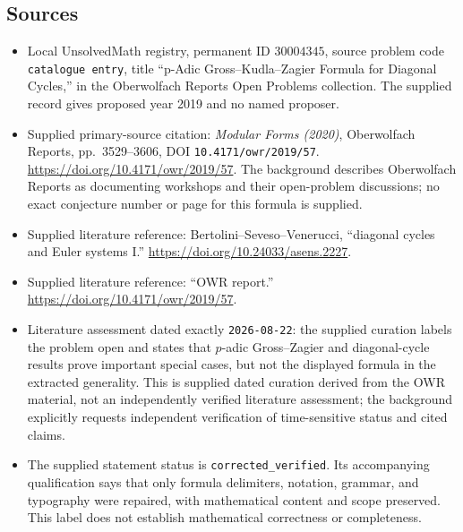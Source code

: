 \documentclass[11pt]{article}
\begin{document}
\subsection{Sources}
\begin{itemize}
\item Local UnsolvedMath registry, permanent ID \(30004345\), source problem code \texttt{catalogue entry}, title ``p-Adic Gross--Kudla--Zagier Formula for Diagonal Cycles,'' in the Oberwolfach Reports Open Problems collection. The supplied record gives proposed year 2019 and no named proposer.
\item Supplied primary-source citation: \emph{Modular Forms (2020)}, Oberwolfach Reports, pp.~3529--3606, DOI \texttt{10.4171/owr/2019/57}. \url{https://doi.org/10.4171/owr/2019/57}. The background describes Oberwolfach Reports as documenting workshops and their open-problem discussions; no exact conjecture number or page for this formula is supplied.
\item Supplied literature reference: Bertolini--Seveso--Venerucci, ``diagonal cycles and Euler systems I.'' \url{https://doi.org/10.24033/asens.2227}.
\item Supplied literature reference: ``OWR report.'' \url{https://doi.org/10.4171/owr/2019/57}.
\item Literature assessment dated exactly \texttt{2026-08-22}: the supplied curation labels the problem open and states that \(p\)-adic Gross--Zagier and diagonal-cycle results prove important special cases, but not the displayed formula in the extracted generality. This is supplied dated curation derived from the OWR material, not an independently verified literature assessment; the background explicitly requests independent verification of time-sensitive status and cited claims.
\item The supplied statement status is \texttt{corrected\_verified}. Its accompanying qualification says that only formula delimiters, notation, grammar, and typography were repaired, with mathematical content and scope preserved. This label does not establish mathematical correctness or completeness.
\end{itemize}
\end{document}
